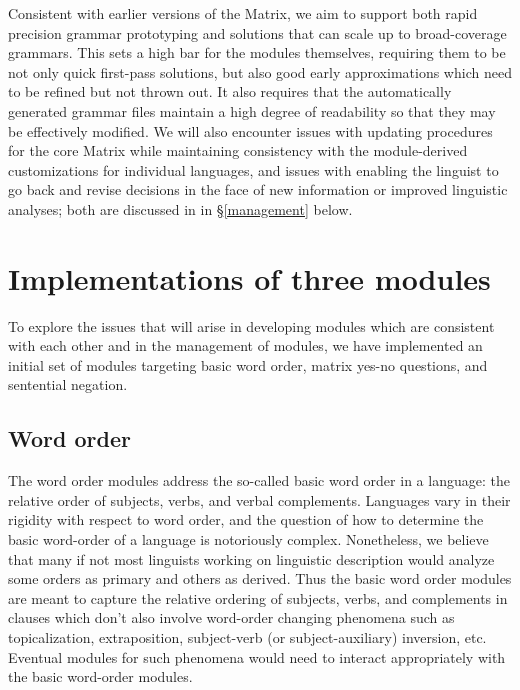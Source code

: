 \documentclass[11pt]{article}
\begin{document}
Consistent with earlier versions of the Matrix, we aim to support
both rapid precision grammar prototyping and solutions that can scale up
to broad-coverage grammars. This sets a high bar for the modules themselves,
requiring them to be not only quick first-pass solutions, but also
good early approximations which need to be refined but not thrown out.
It also requires that the automatically generated grammar files 
maintain a high degree of readability so that they may be effectively
modified.  We will also encounter issues with updating procedures for
the core Matrix while maintaining consistency with the module-derived
customizations for individual languages, and issues with enabling the
linguist to go back and revise decisions in the face of new
information or improved linguistic analyses; both are discussed in
in \S\ref{management} below.

\section{Implementations of three modules}

To explore the issues that will arise in developing modules which
are consistent with each other and in the management of modules, we have
implemented an initial set of modules targeting basic
word order, matrix yes-no questions, and sentential negation.  

\subsection{Word order}

The word order modules address the so-called basic word order in
a language: the relative order of subjects, verbs, and verbal complements.
Languages vary in their rigidity with respect to word order, and the
question of how to determine the basic word-order of a language is 
notoriously complex.  Nonetheless, we believe that many if not most
linguists working on linguistic description would analyze some orders
as primary and others as derived.  Thus the basic word order modules
are meant to capture the relative ordering of subjects, verbs, and complements
in clauses which don't also involve word-order changing phenomena
such as topicalization, extraposition, subject-verb (or subject-auxiliary)
inversion, etc.  Eventual modules for such phenomena would need to
interact appropriately with the basic word-order modules.
\end{document}
